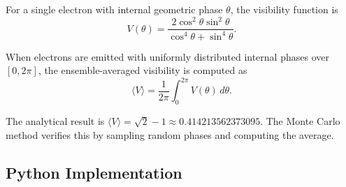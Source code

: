 \documentclass[%
 reprint,
 amsmath,amssymb,
 aps,
 prb,
]{revtex4-2}
\numberwithin{equation}{section}
\begin{document}
For a single electron with internal geometric phase $\theta$, the visibility function is
\begin{equation}
V(\theta) = \frac{2\cos^2\theta\sin^2\theta}{\cos^4\theta + \sin^4\theta}.
\label{eq:visibility_function_appendix}
\end{equation}

When electrons are emitted with uniformly distributed internal phases over $[0, 2\pi]$, the ensemble-averaged visibility is computed as
\begin{equation}
\langle V \rangle = \frac{1}{2\pi}\int_0^{2\pi} V(\theta)\,d\theta.
\label{eq:ensemble_average_appendix}
\end{equation}

The analytical result is $\langle V \rangle = \sqrt{2}-1 \approx 0.414213562373095$. The Monte Carlo method verifies this by sampling random phases and computing the average.


\subsection{Python Implementation}
\end{document}
